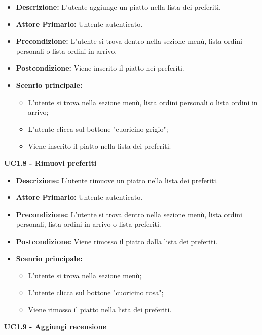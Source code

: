 \begin{itemize}
    \item \textbf{Descrizione:} L'utente aggiunge un piatto nella lista dei preferiti.
    \item \textbf{Attore Primario:} Untente autenticato.
    \item \textbf{Precondizione:} L'utente si trova dentro nella sezione menù, lista ordini personali o lista ordini in arrivo.
    \item \textbf{Postcondizione:} Viene inserito il piatto nei preferiti.
    \item \textbf{Scenrio principale:}
    \begin{itemize}
        \item L'utente si trova nella sezione menù, lista ordini personali o lista ordini in arrivo;
        \item L'utente clicca sul bottone "cuoricino grigio";
        \item Viene inserito il piatto nella lista dei preferiti.
    \end{itemize}
\end{itemize}
\textbf{UC1.8 - Rimuovi preferiti}
\begin{itemize}
    \item \textbf{Descrizione:} L'utente rimuove un piatto nella lista dei preferiti.
    \item \textbf{Attore Primario:} Untente autenticato.
    \item \textbf{Precondizione:} L'utente si trova dentro nella sezione menù, lista ordini personali, lista ordini in arrivo o lista preferiti.
    \item \textbf{Postcondizione:} Viene rimosso il piatto dalla lista dei preferiti.
    \item \textbf{Scenrio principale:}
    \begin{itemize}
        \item L'utente si trova nella sezione menù;
        \item L'utente clicca sul bottone "cuoricino rosa";
        \item Viene rimosso il piatto nella lista dei preferiti.
    \end{itemize}
\end{itemize}
\textbf{UC1.9 - Aggiungi recensione}
